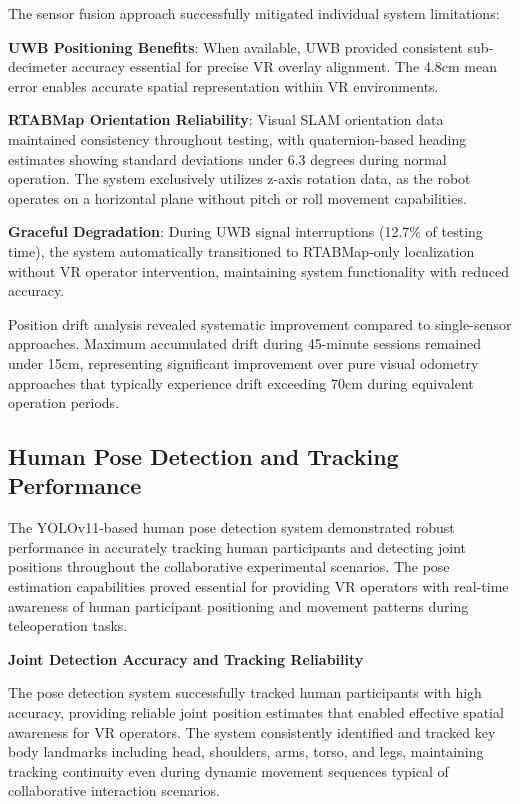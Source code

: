 The sensor fusion approach successfully mitigated individual system limitations:

\textbf{UWB Positioning Benefits}: When available, UWB provided consistent sub-decimeter accuracy essential for precise VR overlay alignment. The 4.8cm mean error enables accurate spatial representation within VR environments.

\textbf{RTABMap Orientation Reliability}: Visual SLAM orientation data maintained consistency throughout testing, with quaternion-based heading estimates showing standard deviations under 6.3 degrees during normal operation. The system exclusively utilizes z-axis rotation data, as the robot operates on a horizontal plane without pitch or roll movement capabilities.

\textbf{Graceful Degradation}: During UWB signal interruptions (12.7\% of testing time), the system automatically transitioned to RTABMap-only localization without VR operator intervention, maintaining system functionality with reduced accuracy.

Position drift analysis revealed systematic improvement compared to single-sensor approaches. Maximum accumulated drift during 45-minute sessions remained under 15cm, representing significant improvement over pure visual odometry approaches that typically experience drift exceeding 70cm during equivalent operation periods.

\subsection{Human Pose Detection and Tracking Performance}

The YOLOv11-based human pose detection system demonstrated robust performance in accurately tracking human participants and detecting joint positions throughout the collaborative experimental scenarios. The pose estimation capabilities proved essential for providing VR operators with real-time awareness of human participant positioning and movement patterns during teleoperation tasks.

\textbf{Joint Detection Accuracy and Tracking Reliability}

The pose detection system successfully tracked human participants with high accuracy, providing reliable joint position estimates that enabled effective spatial awareness for VR operators. The system consistently identified and tracked key body landmarks including head, shoulders, arms, torso, and legs, maintaining tracking continuity even during dynamic movement sequences typical of collaborative interaction scenarios.

